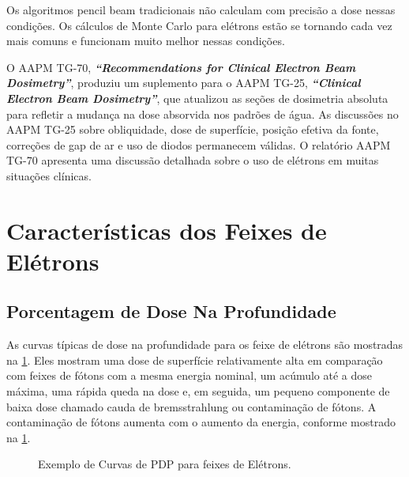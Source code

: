 \documentclass[11pt,a4paper]{article}
\begin{document}
	Os algoritmos pencil beam tradicionais não calculam com precisão a dose nessas condições. Os cálculos de Monte Carlo para elétrons estão se tornando cada vez mais comuns e funcionam muito melhor nessas condições.

	O AAPM TG-70, \textit{\textbf{``Recommendations for Clinical Electron Beam Dosimetry''}}, produziu um suplemento para o AAPM TG-25, \textit{\textbf{``Clinical Electron Beam Dosimetry''}}, que atualizou as seções de dosimetria absoluta para refletir a mudança na dose absorvida nos padrões de água. As discussões no AAPM TG-25 sobre obliquidade, dose de superfície, posição efetiva da fonte, correções de gap de ar e uso de diodos permanecem válidas. O relatório AAPM TG-70 apresenta uma discussão detalhada sobre o uso de elétrons em muitas situações clínicas.

\section{Características dos Feixes de Elétrons}

\subsection*{Porcentagem de Dose Na Profundidade}

	As curvas típicas de dose na profundidade para os feixe de elétrons são mostradas na \ref{fig:pdpeletrons}. Eles mostram uma dose de superfície relativamente alta em comparação com feixes de fótons com a mesma energia nominal, um acúmulo até a dose máxima, uma rápida queda na dose e, em seguida, um pequeno componente de baixa dose chamado cauda de bremsstrahlung ou contaminação de fótons. A contaminação de fótons aumenta com o aumento da energia, conforme mostrado na \ref{fig:pdpeletrons}.

	\begin{figure}[h]
		\centering
		\caption{Exemplo de Curvas de PDP para feixes de Elétrons.}
		\label{fig:pdpeletrons}
	\end{figure}
\end{document}
